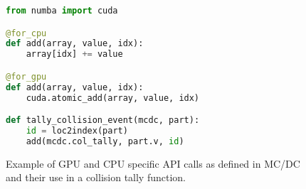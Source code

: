 
\begin{figure}
\begin{lstlisting}[language=Python]
from numba import cuda

@for_cpu
def add(array, value, idx):
    array[idx] += value

@for_gpu
def add(array, value, idx):
    cuda.atomic_add(array, value, idx)

def tally_collision_event(mcdc, part):
    id = loc2index(part)
    add(mcdc.col_tally, part.v, id)
\end{lstlisting}
\caption{Example of GPU and CPU specific API calls as defined in MC/DC and their use in a collision tally function.}
\label{fig:forcpuvgpu}

\end{figure}